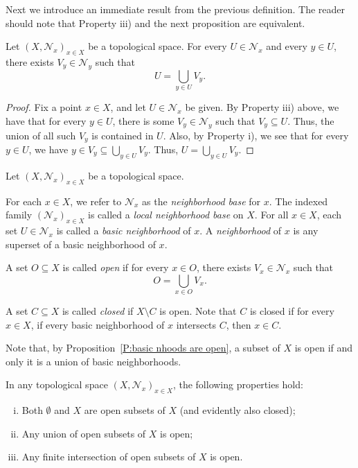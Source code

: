 \documentclass{scrartcl}
\begin{document}
Next we introduce an immediate result from the previous definition. The reader should note that Property iii) and the next proposition are equivalent.

\begin{proposition}
\label{P:basic nhoods are open}
    Let $(X, \mathscr{N}_x)_{x\in X}$ be a topological space. For every $U\in \mathscr{N}_x$ and every $y\in U$, there exists $V_y\in \mathscr{N}_y$ such that \[U=\bigcup\limits_{y\in U}V_y\text{.}\]
\end{proposition}

\begin{proof}
  Fix a point $x\in X$, and let $U\in \mathscr{N}_x$ be given.
  By Property iii) above, we have that for every $y\in U$, there is some $V_y\in \mathscr{N}_y$ such that $V_y\subseteq U$.
  Thus, the union of all such $V_y$ is contained in $U$.
  Also, by Property i), we see that for every $y\in U$, we have $y\in V_y\subseteq \bigcup\limits_{y\in U}V_y$. Thus, $U=\bigcup\limits_{y\in U}V_y$.
\end{proof}

\begin{definition}
  Let $( X, \mathscr{N}_x)_{x\in X}$ be a topological space.

  For each $x\in X$, we refer to $\mathscr{N}_x$ as the \emph{neighborhood base} for $x$. 
  The indexed family $(\mathscr{N}_x)_{x\in X}$ is called a \emph{local neighborhood base} on $X$.
  For all $x\in X$, each set $U\in \mathscr{N}_x$ is called a \emph{basic neighborhood} of $x$. A \emph{neighborhood} of $x$ is any superset of a basic neighborhood of $x$.
    
\end{definition}

\begin{definition}
  A set $O\subseteq X$ is called \emph{open} if for every $x\in O$, there exists $V_x\in \mathscr{N}_x$ such that 
  \[
  O=\bigcup\limits_{x\in O}V_x\text{.}
  \]
  
  A set $C\subseteq X$ is called \emph{closed} if $X\setminus C$ is open. Note that $C$ is closed if for every $x\in X$, if every basic neighborhood of $x$ intersects $C$, then $x\in C$.
\end{definition}

Note that, by Proposition~\ref{P:basic nhoods are open}, a subset of $X$ is open if and only it is a union of basic neighborhoods.

\begin{proposition}
\label{P:properties of open sets}

    In any topological space $(X, \mathscr{N}_x)_{x\in X}$, the following properties hold:

    \begin{enumerate}[i)]
        \item Both $\emptyset$ and $X$ are open subsets of $X$ (and evidently also closed);
        \item Any union of open subsets of $X$ is open;
        \item Any finite intersection of open subsets of $X$ is open.
        
    \end{enumerate}
\end{proposition}
\end{document}
